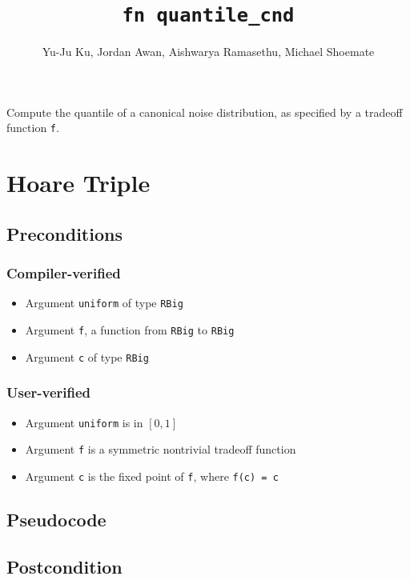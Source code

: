\documentclass{article}
\title{\texttt{fn quantile\_cnd}}
\author{Yu-Ju Ku, Jordan Awan, Aishwarya Ramasethu, Michael Shoemate}
\begin{document}
\maketitle

Compute the quantile of a canonical noise distribution, as specified by a tradeoff function \texttt{f}.

\section{Hoare Triple}

\subsection*{Preconditions}
\subsubsection*{Compiler-verified}
\begin{itemize}
    \item Argument \texttt{uniform} of type \texttt{RBig}
    \item Argument \texttt{f}, a function from \texttt{RBig} to \texttt{RBig}
    \item Argument \texttt{c} of type \texttt{RBig}
\end{itemize}

\subsubsection*{User-verified}
\begin{itemize}
    \item Argument \texttt{uniform} is in $[0, 1]$
    \item Argument \texttt{f} is a symmetric nontrivial tradeoff function
    \item Argument \texttt{c} is the fixed point of \texttt{f}, where \texttt{f(c) = c}
\end{itemize}

\subsection*{Pseudocode}



\subsection*{Postcondition}
\end{document}
